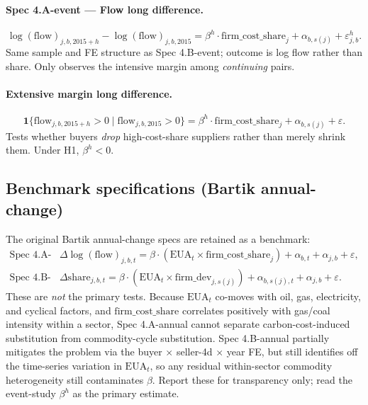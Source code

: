 \documentclass[11pt]{article}
\begin{document}
\paragraph{Spec 4.A-event --- Flow long difference.}
\begin{equation}
  \log(\mathrm{flow})_{j,b,2015+h} - \log(\mathrm{flow})_{j,b,2015}
  = \beta^{h} \cdot \mathrm{firm\_cost\_share}_j
  + \alpha_{b, s(j)} + \varepsilon_{j,b}^{h}.
  \label{eq:4A-event}
\end{equation}
Same sample and FE structure as Spec 4.B-event; outcome is log flow rather than share. Only observes the intensive margin among \emph{continuing} pairs.

\paragraph{Extensive margin long difference.}
\begin{equation}
  \mathbf{1}\{\mathrm{flow}_{j,b,2015+h} > 0 \mid \mathrm{flow}_{j,b,2015} > 0\}
  = \beta^{h}\cdot \mathrm{firm\_cost\_share}_j
  + \alpha_{b,s(j)} + \varepsilon.
\end{equation}
Tests whether buyers \emph{drop} high-cost-share suppliers rather than merely shrink them. Under H1, $\beta^h < 0$.

\subsection{Benchmark specifications (Bartik annual-change)}
\label{sec:b2b-bartik-caveat}

The original Bartik annual-change specs are retained as a benchmark:
\begin{align*}
  \text{Spec 4.A-annual:}\quad & \Delta \log(\mathrm{flow})_{j,b,t} = \beta\cdot(\mathrm{EUA}_t\times\mathrm{firm\_cost\_share}_j) + \alpha_{b,t} + \alpha_{j,b} + \varepsilon,\\
  \text{Spec 4.B-annual:}\quad & \Delta \mathrm{share}_{j,b,t} = \beta\cdot(\mathrm{EUA}_t\times\mathrm{firm\_dev}_{j,s(j)}) + \alpha_{b,s(j),t} + \alpha_{j,b} + \varepsilon.
\end{align*}
These are \emph{not} the primary tests. Because $\mathrm{EUA}_t$ co-moves with oil, gas, electricity, and cyclical factors, and $\mathrm{firm\_cost\_share}$ correlates positively with gas/coal intensity within a sector, Spec 4.A-annual cannot separate carbon-cost-induced substitution from commodity-cycle substitution. Spec 4.B-annual partially mitigates the problem via the buyer $\times$ seller-4d $\times$ year FE, but still identifies off the time-series variation in $\mathrm{EUA}_t$, so any residual within-sector commodity heterogeneity still contaminates $\beta$. Report these for transparency only; read the event-study $\beta^h$ as the primary estimate.
\end{document}
